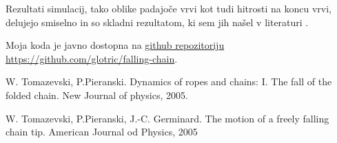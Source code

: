 \documentclass[a4paper, 12pt, slovene]{article}
\numberwithin{equation}{section}
\begin{document}
Rezultati simulacij, tako oblike padajoče vrvi kot tudi hitrosti na koncu vrvi, delujejo smiselno in so skladni rezultatom, ki sem jih našel v literaturi \cite{simplechainfall}\cite{tomazevski}. \par\vspace{5mm}

Moja koda je javno dostopna na \href{https://github.com/glotric/falling-chain}{github repozitoriju} \url{https://github.com/glotric/falling-chain}.



\pagebreak
\begin{thebibliography}{9}

W. Tomazevski, P.Pieranski. Dynamics of ropes and chains: I. The fall of the folded chain. New Journal of physics, 2005.

W. Tomazevski, P.Pieranski, J.-C. Germinard. The motion of a freely falling chain tip. American Journal od Physics, 2005



\end{thebibliography}
\end{document}
